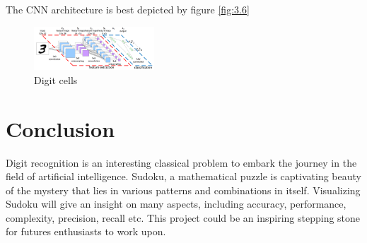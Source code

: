 \documentclass[twocolumn, switch]{article} %
\begin{document}
The CNN architecture is best depicted by figure \eqref{fig:3.6}

\begin{figure}[!htbp]
    \centering
    \includegraphics[width=0.4\textwidth]{cnn_layers.png}
    \caption[Digit cells]{Digit cells}
    \label{fig:3.6}
\end{figure}

\section{Conclusion}
\label{sec:conclusion}
Digit recognition is an interesting classical problem to embark the journey in the field of artificial intelligence. Sudoku, a mathematical puzzle is captivating beauty of the mystery that lies in various patterns and combinations in itself. Visualizing Sudoku will give an insight on many aspects, including accuracy, performance, complexity, precision, recall etc. This project could be an inspiring stepping stone for futures enthusiasts to work upon.



\normalsize



\end{document}
